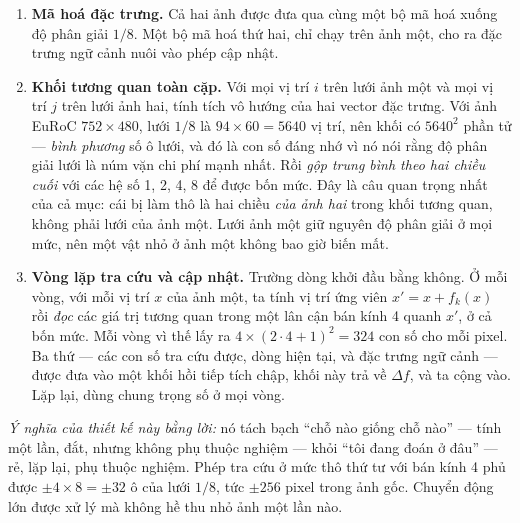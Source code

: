 \documentclass[../../deep_learning.tex]{subfiles}
\begin{document}
\begin{enumerate}
\item \textbf{Mã hoá đặc trưng.} Cả hai ảnh được đưa qua cùng một bộ mã hoá xuống độ phân giải \(1/8\). Một bộ mã hoá thứ hai, chỉ chạy trên ảnh một, cho ra đặc trưng ngữ cảnh nuôi vào phép cập nhật.
\item \textbf{Khối tương quan toàn cặp.} Với mọi vị trí \(i\) trên lưới ảnh một và mọi vị trí \(j\) trên lưới ảnh hai, tính tích vô hướng của hai vector đặc trưng. Với ảnh EuRoC \(752\times480\), lưới \(1/8\) là \(94\times60 = 5640\) vị trí, nên khối có \(5640^2\) phần tử --- \emph{bình phương} số ô lưới, và đó là con số đáng nhớ vì nó nói rằng độ phân giải lưới là núm vặn chi phí mạnh nhất. Rồi \emph{gộp trung bình theo hai chiều cuối} với các hệ số 1, 2, 4, 8 để được bốn mức. Đây là câu quan trọng nhất của cả mục: cái bị làm thô là hai chiều \emph{của ảnh hai} trong khối tương quan, không phải lưới của ảnh một. Lưới ảnh một giữ nguyên độ phân giải ở mọi mức, nên một vật nhỏ ở ảnh một không bao giờ biến mất.
\item \textbf{Vòng lặp tra cứu và cập nhật.} Trường dòng khởi đầu bằng không. Ở mỗi vòng, với mỗi vị trí \(x\) của ảnh một, ta tính vị trí ứng viên \(x' = x + f_k(x)\) rồi \emph{đọc} các giá trị tương quan trong một lân cận bán kính 4 quanh \(x'\), ở cả bốn mức. Mỗi vòng vì thế lấy ra \(4 \times (2\cdot 4+1)^2 = 324\) con số cho mỗi pixel. Ba thứ --- các con số tra cứu được, dòng hiện tại, và đặc trưng ngữ cảnh --- được đưa vào một khối hồi tiếp tích chập, khối này trả về \(\Delta f\), và ta cộng vào. Lặp lại, dùng chung trọng số ở mọi vòng.
\end{enumerate}

\emph{Ý nghĩa của thiết kế này bằng lời:} nó tách bạch ``chỗ nào giống chỗ nào'' --- tính một lần, đắt, nhưng không phụ thuộc nghiệm --- khỏi ``tôi đang đoán ở đâu'' --- rẻ, lặp lại, phụ thuộc nghiệm. Phép tra cứu ở mức thô thứ tư với bán kính 4 phủ được \(\pm 4 \times 8 = \pm 32\) ô của lưới \(1/8\), tức \(\pm 256\) pixel trong ảnh gốc. Chuyển động lớn được xử lý mà không hề thu nhỏ ảnh một lần nào.
\end{document}

